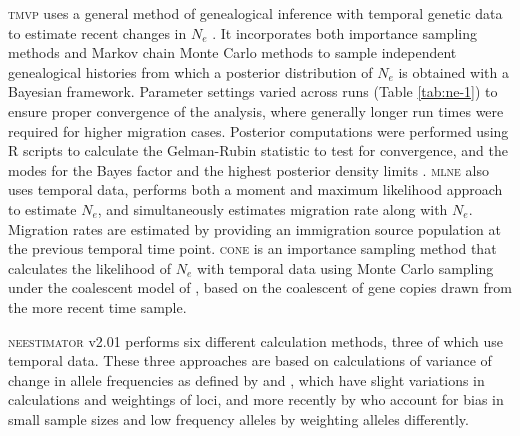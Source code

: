 \textsc{tmvp} uses a general method of genealogical inference with temporal genetic data to 
estimate recent changes in $N_e$ \citep{Beaumont:2003}. It incorporates both importance 
sampling methods and Markov chain Monte Carlo methods to sample independent genealogical 
histories from which a posterior distribution of $N_e$ is obtained with a Bayesian 
framework. Parameter settings varied across runs (Table \ref{tab:ne-1}) to ensure proper convergence of 
the analysis, where generally longer run times were required for higher migration cases. 
Posterior computations were performed using R scripts to calculate the Gelman-Rubin statistic 
to test for convergence, and the modes for the Bayes factor and the highest posterior density 
limits \citep{Barker:2011}. \textsc{mlne} \citep{Wang:2003} also uses temporal data, performs 
both a moment and maximum likelihood approach to estimate $N_e$, and simultaneously 
estimates migration rate along with $N_e$. Migration rates are estimated by providing 
an immigration source population at the previous temporal time point. \textsc{cone} \citep{Anderson:2005} 
is an importance sampling method that calculates the likelihood of $N_e$ with temporal 
data using Monte Carlo sampling under the coalescent model of \citet{Berthier:2002}, based on 
the coalescent of gene copies drawn from the more recent time sample.

\textsc{neestimator} v2.01 \citep{Do:2014} performs six different calculation methods, three 
of which use temporal data. These three approaches are based on calculations of variance of 
change in allele frequencies as defined by \citet{Nei:1981} and \citet{Pollak:1983}, which 
have slight variations in calculations and weightings of loci, and more recently by \citet{Jorde:2007} 
who account for bias in small sample sizes and low frequency alleles by 
weighting alleles differently.

